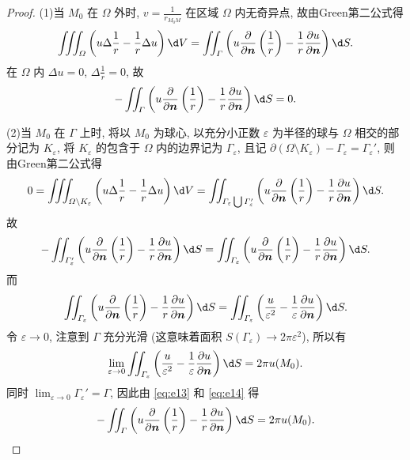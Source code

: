 \begin{proof}
  (1)当 $M_0$ 在 $\varOmega$ 外时, $\displaystyle v=\frac{1}{r_{M_0M}}$ 在区域 $\varOmega$ 内无奇异点, 故由Green第二公式得
  \[\iiint_{\varOmega} \left(u\Delta\frac{1}{r}-\frac{1}{r}\Delta u\right)\d V
    = \iint_{\varGamma}\left(u\frac{\partial}{\partial\bm{n}}\left(\frac{1}{r}\right)
      - \frac{1}{r}\frac{\partial u}{\partial\bm{n}}\right) \d S.\]
  在 $\varOmega$ 内 $\Delta u=0$, $\displaystyle\Delta\frac{1}{r}=0$, 故
  \[-\iint_{\varGamma}\left(u\frac{\partial}{\partial\bm{n}}\left(\frac{1}{r}\right)
    - \frac{1}{r}\frac{\partial u}{\partial\bm{n}}\right)\d S = 0.\]

  (2)当 $M_0$ 在 $\varGamma$ 上时, 将以 $M_0$ 为球心, 
  以充分小正数 $\varepsilon$ 为半径的球与 $\varOmega$ 相交的部分记为 $K_{\varepsilon}$,
  将 $K_{\varepsilon}$ 的包含于 $\varOmega$ 内的边界记为 $\varGamma_{\varepsilon}$,
  且记 $\partial(\varOmega\setminus K_{\varepsilon})-\varGamma_{\varepsilon}=\varGamma_{\varepsilon}'$,
  则由Green第二公式得
  \[0 = \iiint_{\varOmega\backslash K_{\varepsilon}}
    \left(u\Delta\frac{1}{r} - \frac{1}{r}\Delta u\right)\d V
    = \iint_{\varGamma_{\varepsilon}\bigcup\varGamma_{\varepsilon}'} \left(u\frac{\partial}{\partial\bm{n}}
      \left(\frac{1}{r}\right)-\frac{1}{r}\frac{\partial u}{\partial\bm{n}}\right) \d S.\]
  故
  \begin{equation}\label{eq:e13}
    -\iint_{\varGamma_{\varepsilon}'} \left(u\frac{\partial}{\partial\bm{n}}\left(\frac{1}{r}\right)
    -\frac{1}{r}\frac{\partial u}{\partial\bm{n}}\right) \d S
    = \iint_{\varGamma_{\varepsilon}}\left(u\frac{\partial}{\partial\bm{n}}
      \left(\frac{1}{r}\right) - \frac{1}{r}\frac{\partial u}{\partial\bm{n}}\right)\d S.
  \end{equation}
  而
  \[\iint_{\varGamma_{\varepsilon}} \left(u\frac{\partial}{\partial\bm{n}}\left(\frac{1}{r}\right)
    -\frac{1}{r}\frac{\partial u}{\partial\bm{n}}\right) \d S
    = \iint_{\varGamma_{\varepsilon}}\left(\frac{u}{\varepsilon^2}
      - \frac{1}{\varepsilon}\frac{\partial u}{\partial\bm{n}}\right) \d S.\]
  令 $\varepsilon\to 0$, 注意到 $\varGamma$ 充分光滑
  (这意味着面积 $S(\varGamma_{\varepsilon})\to 2\pi\varepsilon^2$), 所以有
  \begin{equation}\label{eq:e14}
    \lim_{\varepsilon\to 0} \iint_{\varGamma_{\varepsilon}}
    \left(\frac{u}{\varepsilon^2}-\frac{1}{\varepsilon}\frac{\partial u}{\partial\bm{n}}\right)\d S
    = 2\pi u(M_0).
  \end{equation}
  同时 $\displaystyle\lim_{\varepsilon\to0}\varGamma_{\varepsilon}'=\varGamma$,
  因此由 \eqref{eq:e13} 和 \eqref{eq:e14} 得
  \[-\iint_{\varGamma} \left(u\frac{\partial}{\partial\bm{n}}\left(\frac{1}{r}\right)-\frac{1}{r}
    \frac{\partial u}{\partial\bm{n}}\right)\d S = 2\pi u(M_0). \qedhere\]
\end{proof}


